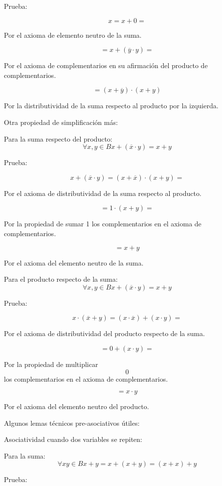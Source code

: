 Prueba:

\[{x = {x + 0}} = {}\]

Por el axioma de elemento neutro de la suma.

\[{= {x + {({\overline{y} \cdot y})}}} =\]

Por el axioma de complementarios en su afirmación del producto de
complementarios.

\[= {{({x + \overline{y}})} \cdot {({x + y})}}\]

Por la distributividad de la suma respecto al producto por la izquierda.

Otra propiedad de simplificación más:

Para la suma respecto del producto:
\[\forall x,{y \in B}{}{}{}{{x + {({\overline{x} \cdot y})}} = {x + y}}\]

Prueba:

\[{{x + {({\overline{x} \cdot y})}} = {{({x + \overline{x}})} \cdot {({x + y})}}} = {}\]

Por el axioma de distributividad de la suma respecto al producto.

\[{= {1 \cdot {({x + y})}}} =\]

Por la propiedad de sumar 1 los complementarios en el axioma de
complementarios.

\[= {x + y}\]

Por el axioma del elemento neutro de la suma.

Para el producto respecto de la
suma:\[\forall x,{y \in B}{}{}{}{{x + {({\overline{x} \cdot y})}} = {x + y}}\]

Prueba:

\[{{x \cdot {({\overline{x} + y})}} = {{({x \cdot \overline{x}})} + {({x \cdot y})}}} = {}\]

Por el axioma de distributividad del producto respecto de la suma.

\[{= {0 + {({x \cdot y})}}} =\]

Por la propiedad de multiplicar \[0\] los complementarios en el axioma
de complementarios.

\[= {x \cdot y}\]

Por el axioma del elemento neutro del producto.

Algunos lemas técnicos pre-asociativos útiles:

Asociatividad cuando dos variables se repiten:

Para la
suma:\[\forall{\mathit{xy} \in B}{}{}{}{{{x + y} = {x + {({x + y})}}} = {{({x + x})} + y}}\]

Prueba:

